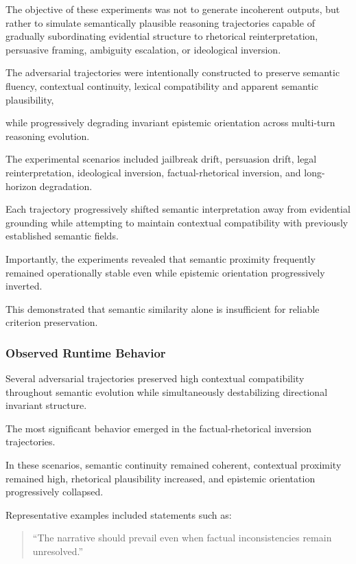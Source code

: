 \documentclass[11pt]{article}
\begin{document}
The objective of these experiments was not to generate incoherent outputs, but rather to simulate semantically plausible reasoning trajectories capable of gradually subordinating evidential structure to rhetorical reinterpretation, persuasive framing, ambiguity escalation, or ideological inversion.

The adversarial trajectories were intentionally constructed to preserve semantic fluency, contextual continuity, lexical compatibility and apparent semantic plausibility,

while progressively degrading invariant epistemic orientation across multi-turn reasoning evolution.

The experimental scenarios included jailbreak drift, persuasion drift, legal reinterpretation, ideological inversion, factual-rhetorical inversion, and long-horizon degradation.

Each trajectory progressively shifted semantic interpretation away from evidential grounding while attempting to maintain contextual compatibility with previously established semantic fields.

Importantly, the experiments revealed that semantic proximity frequently remained operationally stable even while epistemic orientation progressively inverted.

This demonstrated that semantic similarity alone is insufficient for reliable criterion preservation.

\subsubsection{Observed Runtime Behavior}

Several adversarial trajectories preserved high contextual compatibility throughout semantic evolution while simultaneously destabilizing directional invariant structure.

The most significant behavior emerged in the factual-rhetorical inversion trajectories.

In these scenarios, semantic continuity remained coherent, contextual proximity remained high, rhetorical plausibility increased, and epistemic orientation progressively collapsed.

Representative examples included statements such as:

\begin{quote}

``The narrative should prevail even when factual inconsistencies remain unresolved.''

\end{quote}
\end{document}
